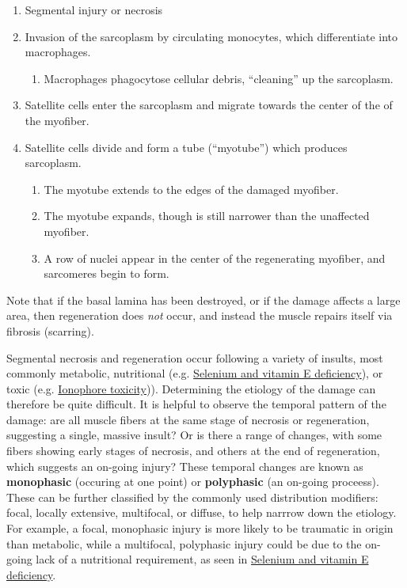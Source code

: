 \documentclass[openany]{report}
\providecommand{\tightlist}{%
  \setlength{\itemsep}{0pt}\setlength{\parskip}{0pt}}
\begin{document}
\begin{enumerate}
\def\labelenumi{\arabic{enumi}.}
\tightlist
\item
  Segmental injury or necrosis
\item
  Invasion of the sarcoplasm by circulating monocytes, which
  differentiate into macrophages.

  \begin{enumerate}
  \def\labelenumii{\roman{enumii})}
  \tightlist
  \item
    Macrophages phagocytose cellular debris, ``cleaning'' up the
    sarcoplasm.
  \end{enumerate}
\item
  Satellite cells enter the sarcoplasm and migrate towards the center of
  the of the myofiber.
\item
  Satellite cells divide and form a tube (``myotube'') which produces
  sarcoplasm.

  \begin{enumerate}
  \def\labelenumii{\roman{enumii})}
  \tightlist
  \item
    The myotube extends to the edges of the damaged myofiber.
  \item
    The myotube expands, though is still narrower than the unaffected
    myofiber.
  \item
    A row of nuclei appear in the center of the regenerating myofiber,
    and sarcomeres begin to form.
  \end{enumerate}
\end{enumerate}

Note that if the basal lamina has been destroyed, or if the damage
affects a large area, then regeneration does \emph{not} occur, and
instead the muscle repairs itself via fibrosis (scarring).

Segmental necrosis and regeneration occur following a variety of
insults, most commonly metabolic, nutritional (e.g.
\protect\hyperlink{selenium-and-vitamin-e-deficiency}{Selenium and
vitamin E deficiency}), or toxic (e.g.
\protect\hyperlink{ionophore-toxicity}{Ionophore toxicity})).
Determining the etiology of the damage can therefore be quite difficult.
It is helpful to observe the temporal pattern of the damage: are all
muscle fibers at the same stage of necrosis or regeneration, suggesting
a single, massive insult? Or is there a range of changes, with some
fibers showing early stages of necrosis, and others at the end of
regeneration, which suggests an on-going injury? These temporal changes
are known as \textbf{monophasic} (occuring at one point) or
\textbf{polyphasic} (an on-going proceess). These can be further
classified by the commonly used distribution modifiers: focal, locally
extensive, multifocal, or diffuse, to help narrrow down the etiology.
For example, a focal, monophasic injury is more likely to be traumatic
in origin than metabolic, while a multifocal, polyphasic injury could be
due to the on-going lack of a nutritional requirement, as seen in
\protect\hyperlink{selenium-and-vitamin-e-deficiency}{Selenium and
vitamin E deficiency}.
\end{document}
